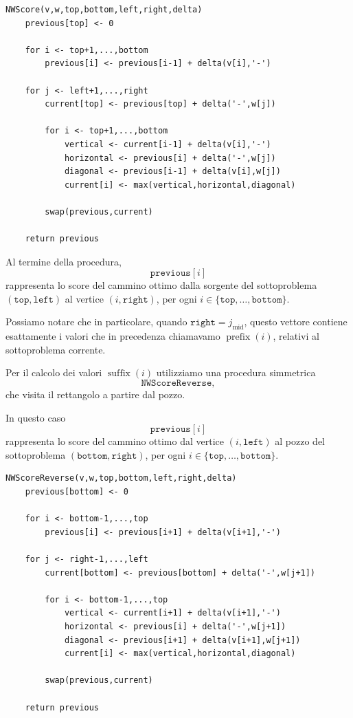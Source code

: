 \begin{codeblock}
\begin{lstlisting}[style=pseudo,caption={Calcolo degli score in spazio lineare}]
NWScore(v,w,top,bottom,left,right,delta)
    previous[top] <- 0

    for i <- top+1,...,bottom
        previous[i] <- previous[i-1] + delta(v[i],'-')

    for j <- left+1,...,right
        current[top] <- previous[top] + delta('-',w[j])

        for i <- top+1,...,bottom
            vertical <- current[i-1] + delta(v[i],'-')
            horizontal <- previous[i] + delta('-',w[j])
            diagonal <- previous[i-1] + delta(v[i],w[j])
            current[i] <- max(vertical,horizontal,diagonal)

        swap(previous,current)

    return previous
\end{lstlisting}
\end{codeblock}
Al termine della procedura,
\[
    \texttt{previous}[i]
\]
rappresenta lo score del cammino ottimo dalla sorgente del sottoproblema $(\texttt{top},\texttt{left})$ al vertice $(i,\texttt{right})$,
per ogni $i \in \{ \texttt{top},\ldots,\texttt{bottom} \}$.

Possiamo notare che in particolare, quando $\texttt{right} = j_{\mathrm{mid}}$, questo vettore contiene esattamente
i valori che in precedenza chiamavamo $\operatorname{prefix}(i)$, relativi al sottoproblema corrente.

Per il calcolo dei valori $\operatorname{suffix}(i)$ utilizziamo una procedura simmetrica
\[
    \texttt{NWScoreReverse},
\]
che visita il rettangolo a partire dal pozzo.

In questo caso
\[
    \texttt{previous}[i]
\]
rappresenta lo score del cammino ottimo dal vertice $(i,\texttt{left})$ al pozzo del sottoproblema $(\texttt{bottom},\texttt{right})$,
per ogni $i \in \{ \texttt{top},\ldots,\texttt{bottom} \}$.

\begin{codeblock}
\begin{lstlisting}[style=pseudo,caption={Calcolo inverso degli score}]
NWScoreReverse(v,w,top,bottom,left,right,delta)
    previous[bottom] <- 0

    for i <- bottom-1,...,top
        previous[i] <- previous[i+1] + delta(v[i+1],'-')

    for j <- right-1,...,left
        current[bottom] <- previous[bottom] + delta('-',w[j+1])

        for i <- bottom-1,...,top
            vertical <- current[i+1] + delta(v[i+1],'-')
            horizontal <- previous[i] + delta('-',w[j+1])
            diagonal <- previous[i+1] + delta(v[i+1],w[j+1])
            current[i] <- max(vertical,horizontal,diagonal)

        swap(previous,current)

    return previous
\end{lstlisting}
\end{codeblock}

